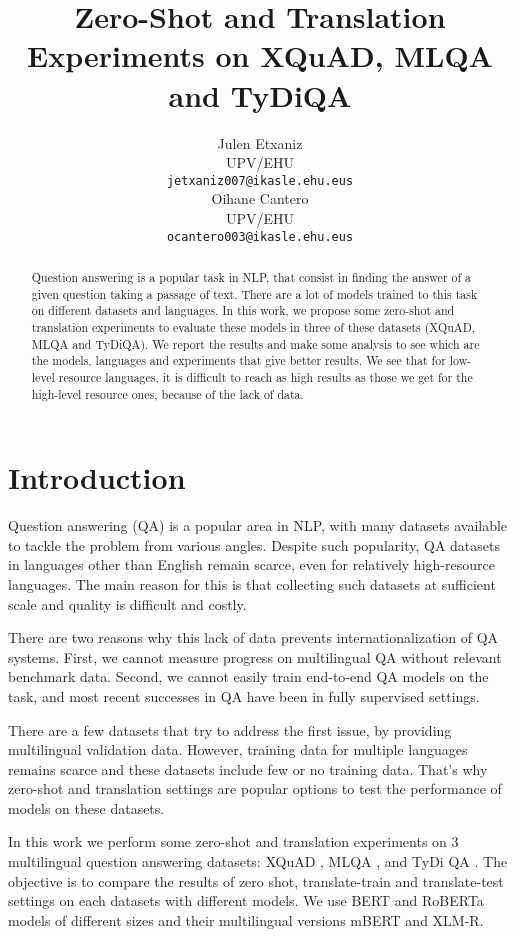 \documentclass[11pt]{article}
\title{Zero-Shot and Translation Experiments on XQuAD, MLQA and TyDiQA}
\author{Julen Etxaniz \\
  UPV/EHU \\
  \texttt{jetxaniz007@ikasle.ehu.eus} \\\And
  Oihane Cantero \\
  UPV/EHU \\
  \texttt{ocantero003@ikasle.ehu.eus}}
\begin{document}
\maketitle
\begin{abstract}

Question answering is a popular task in NLP, that consist in finding the answer of a given question taking a passage of text. There are a lot of models trained to this task on different datasets and languages. In this work, we propose some zero-shot and translation experiments to evaluate these models in three of these datasets (XQuAD, MLQA and TyDiQA). We report the results and make some analysis to see which are the models, languages and experiments that give better results. We see that for low-level resource languages, it is difficult to reach as high results as those we get for the high-level resource ones, because of the lack of data.


\end{abstract}

\section{Introduction}

Question answering (QA) is a popular area in NLP, with many datasets available to tackle the problem from various angles. Despite such popularity, QA datasets in languages other than English remain scarce, even for relatively high-resource languages. The main reason for this is that collecting such datasets at sufficient scale and quality is difficult and costly.

There are two reasons why this lack of data prevents internationalization of QA systems. First, we cannot measure progress on multilingual QA without relevant benchmark data. Second, we cannot easily train end-to-end QA models on the task, and most recent successes in QA have been in fully supervised settings.

There are a few datasets that try to address the first issue, by providing multilingual validation data. However, training data for multiple languages remains scarce and these datasets include few or no training data. That's why zero-shot and translation settings are popular options to test the performance of models on these datasets.

In this work we perform some zero-shot and translation experiments on 3 multilingual question answering datasets: XQuAD \cite{Artetxe:etal:2019}, MLQA \cite{lewis2019mlqa}, and TyDi QA \cite{tydiqa}. The objective is to compare the results of zero shot, translate-train and translate-test settings on each datasets with different models. We use BERT and RoBERTa models of different sizes and their multilingual versions mBERT and XLM-R.
\end{document}
